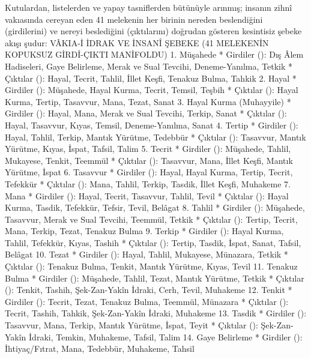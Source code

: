 \documentclass[11pt,a4paper]{article}
\begin{document}
Kutulardan, listelerden ve yapay tasniflerden bütünüyle arınmış; insanın zihnî vakıasında cereyan eden 41 melekenin her birinin nereden beslendiğini (girdilerini) ve nereyi beslediğini (çıktılarını) doğrudan gösteren kesintisiz şebeke akışı şudur:
VÂKIA-İ İDRAK VE İNSANÎ ŞEBEKE (41 MELEKENİN KOPUKSUZ GİRDİ-ÇIKTI MANİFOLDU)
1. Müşahede
 * Girdiler (\leftarrow): Dış Âlem Hadiseleri, Gaye Belirleme, Merak ve Sual Tevcihi, Deneme-Yanılma, Tetkik
 * Çıktılar (\rightarrow): Hayal, Tecrit, Tahlil, İllet Keşfi, Tenakuz Bulma, Tahkik
2. Hayal
 * Girdiler (\leftarrow): Müşahede, Hayal Kurma, Tecrit, Temsil, Teşbih
 * Çıktılar (\rightarrow): Hayal Kurma, Tertip, Tasavvur, Mana, Tezat, Sanat
3. Hayal Kurma (Muhayyile)
 * Girdiler (\leftarrow): Hayal, Mana, Merak ve Sual Tevcihi, Terkip, Sanat
 * Çıktılar (\rightarrow): Hayal, Tasavvur, Kıyas, Temsil, Deneme-Yanılma, Sanat
4. Tertip
 * Girdiler (\leftarrow): Hayal, Tahlil, Terkip, Mantık Yürütme, Tedebbür
 * Çıktılar (\rightarrow): Tasavvur, Mantık Yürütme, Kıyas, İspat, Tafsil, Talim
5. Tecrit
 * Girdiler (\leftarrow): Müşahede, Tahlil, Mukayese, Tenkit, Teemmül
 * Çıktılar (\rightarrow): Tasavvur, Mana, İllet Keşfi, Mantık Yürütme, İspat
6. Tasavvur
 * Girdiler (\leftarrow): Hayal, Hayal Kurma, Tertip, Tecrit, Tefekkür
 * Çıktılar (\rightarrow): Mana, Tahlil, Terkip, Tasdik, İllet Keşfi, Muhakeme
7. Mana
 * Girdiler (\leftarrow): Hayal, Tecrit, Tasavvur, Tahlil, Tevil
 * Çıktılar (\rightarrow): Hayal Kurma, Tasdik, Tefekkür, Tefsir, Tevil, Belâgat
8. Tahlil
 * Girdiler (\leftarrow): Müşahede, Tasavvur, Merak ve Sual Tevcihi, Teemmül, Tetkik
 * Çıktılar (\rightarrow): Tertip, Tecrit, Mana, Terkip, Tezat, Tenakuz Bulma
9. Terkip
 * Girdiler (\leftarrow): Hayal Kurma, Tahlil, Tefekkür, Kıyas, Tashih
 * Çıktılar (\rightarrow): Tertip, Tasdik, İspat, Sanat, Tafsil, Belâgat
10. Tezat
 * Girdiler (\leftarrow): Hayal, Tahlil, Mukayese, Münazara, Tetkik
 * Çıktılar (\rightarrow): Tenakuz Bulma, Tenkit, Mantık Yürütme, Kıyas, Tevil
11. Tenakuz Bulma
 * Girdiler (\leftarrow): Müşahede, Tahlil, Tezat, Mantık Yürütme, Tetkik
 * Çıktılar (\rightarrow): Tenkit, Tashih, Şek-Zan-Yakîn İdraki, Cerh, Tevil, Muhakeme
12. Tenkit
 * Girdiler (\leftarrow): Tecrit, Tezat, Tenakuz Bulma, Teemmül, Münazara
 * Çıktılar (\rightarrow): Tecrit, Tashih, Tahkik, Şek-Zan-Yakîn İdraki, Muhakeme
13. Tasdik
 * Girdiler (\leftarrow): Tasavvur, Mana, Terkip, Mantık Yürütme, İspat, Teyit
 * Çıktılar (\rightarrow): Şek-Zan-Yakîn İdraki, Temkin, Muhakeme, Tafsil, Talim
14. Gaye Belirleme
 * Girdiler (\leftarrow): İhtiyaç/Fıtrat, Mana, Tedebbür, Muhakeme, Tahsil
\end{document}
